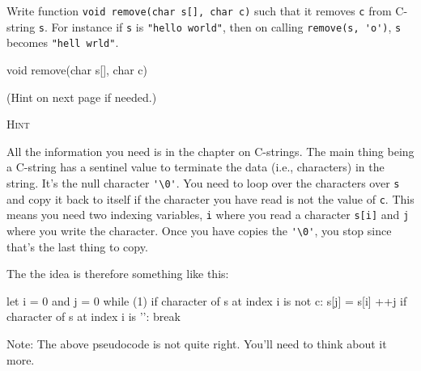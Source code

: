 

\nextq
Write function
\verb!void remove(char s[], char c)!
such that it removes \verb!c! from C-string \verb!s!.
For instance if \verb!s! is \verb!"hello world"!,
then on calling \verb!remove(s, 'o')!,
\verb!s! becomes \verb!"hell wrld"!.
\\
\ANSWER
\begin{answercode}
void remove(char s[], char c)
{
}
\end{answercode}
(Hint on next page if needed.)

\newpage
\textsc{Hint}

All the information you need is in the chapter on C-strings.
The main thing being a C-string has a sentinel value to terminate
the data (i.e., characters) in the string.
It's the null character \verb!'\0'!.
You need to loop over the characters over \verb!s!
and copy it back to itself if the character you have read is not
the value of \verb!c!.
This means you need two indexing variables,
\verb!i! where you read a character \verb!s[i]!
and \verb!j! where you write the character.
Once you have copies the \verb!'\0'!, you stop since that's the last
thing to copy.

The the idea is therefore something like this:
\begin{console}[frame=single,fontsize]
let i = 0 and j = 0
while (1)
    if character of s at index i is not c:
        s[j] = s[i]
        ++j
    if character of s at index i is '\0':
        break
\end{console}
Note: The above pseudocode is not quite right.
You'll need to think about it more.

